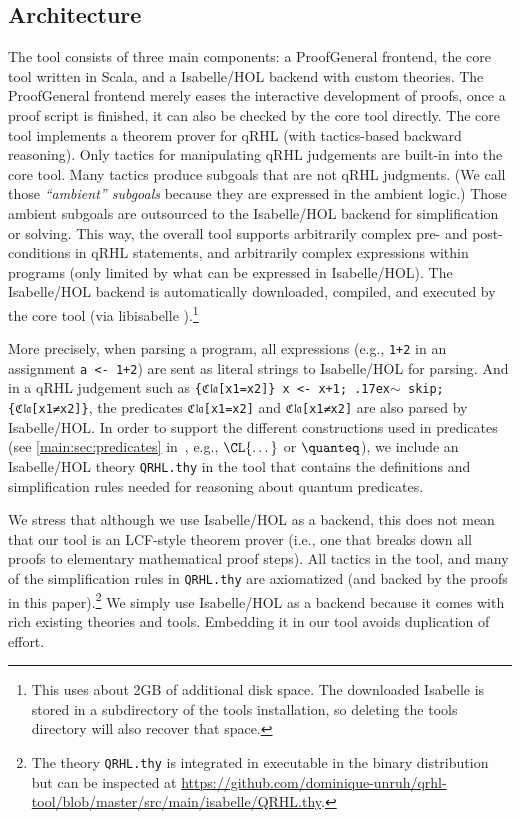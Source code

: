 \documentclass{article}
\newcommand\mytilde{\raise.17ex\hbox{$\scriptstyle\sim$}}
\newcommand\qrhlautoref[1]{\autoref*{main:#1} in~\cite{qrhl-paper-from-manual}}
\begin{document}

\subsection{Architecture}

The tool consists of three main components: a ProofGeneral
\cite{proofgeneral} frontend, the core tool written in Scala, and a
Isabelle/HOL \cite{isabelle} backend with custom theories. The
ProofGeneral frontend merely eases the interactive development of
proofs, once a proof script is finished, it can also be checked by the
core tool directly. The core tool implements a theorem prover for qRHL
(with tactics-based backward reasoning). Only tactics for manipulating
qRHL judgements are built-in into the core tool. Many tactics produce
subgoals that are not qRHL judgments.
(We call those \emph{``ambient'' subgoals}%
 because they are expressed in the ambient logic.)
Those ambient subgoals are outsourced to
the Isabelle/HOL backend for simplification or solving. This way, the
overall tool supports arbitrarily complex pre- and post-conditions in
qRHL statements, and arbitrarily complex expressions within programs
(only limited by what can be expressed in Isabelle/HOL). The
Isabelle/HOL backend is automatically downloaded, compiled, and
executed by the core tool (via libisabelle \cite{libisabelle}).\footnote{This
  uses about 2GB of additional disk space.
  The downloaded Isabelle is stored in a subdirectory of the tools installation,
  so deleting the tools directory will also recover that space.}
  

More precisely, when parsing a program, all expressions (e.g.,
\texttt{1+2} in an assignment \texttt{a <- 1+2}) are sent as literal
strings to Isabelle/HOL for parsing. And in a qRHL judgement such as
\texttt{\{ℭ𝔩𝔞[x1=x2]\} x <- x+1; \mytilde{} skip; \{ℭ𝔩𝔞[x1≠x2]\}}, the
predicates \texttt{ℭ𝔩𝔞[x1=x2]} and \texttt{ℭ𝔩𝔞[x1≠x2]} are also parsed
by Isabelle/HOL. In order to support the different constructions used
in predicates (see \qrhlautoref{sec:predicates}, e.g., $\CL{\dots}$
or $\quanteq$),
we include an Isabelle/HOL theory \texttt{QRHL.thy} in the tool that
contains the definitions and simplification rules needed for reasoning
about quantum predicates.

We stress that although we use Isabelle/HOL as a backend, this does
not mean that our tool is an LCF-style theorem prover (i.e., one that
breaks down all proofs to elementary mathematical proof steps).  All
tactics in the tool, and many of the simplification rules in
\texttt{QRHL.thy} are axiomatized (and backed by the proofs in this
paper).\footnote{The theory \texttt{QRHL.thy} is integrated in executable in the binary distribution
  but can be inspected 
  at \url{https://github.com/dominique-unruh/qrhl-tool/blob/master/src/main/isabelle/QRHL.thy}.}
We simply use Isabelle/HOL as a backend because it comes with
rich existing theories and tools. Embedding it in our tool avoids
duplication of effort.
\end{document}

